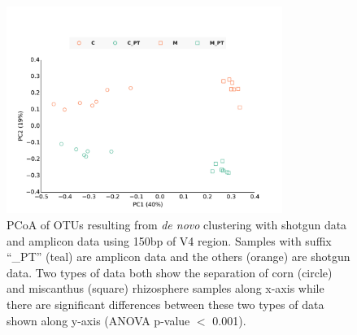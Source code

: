 \documentclass[12pt]{article}
\begin{document}
\begin{figure}[tbph!]
  \centering
  \includegraphics[width=0.8\textwidth]{figs/V4_SGvsPT_pcoa}

  \caption[PCoA of OTUs resulting from {\em de novo} clustering with
  shotgun data and amplicon data using 150bp of V4 region]{PCoA of
  OTUs resulting from {\em de novo} clustering with shotgun data and
  amplicon data using 150bp of V4 region. Samples with suffix ``\_PT''
  (teal) are amplicon data and the others (orange) are shotgun
  data. Two types of data both show the separation of corn (circle)
  and miscanthus (square) rhizosphere samples along x-axis while there
  are significant differences between these two types of data shown
  along y-axis (ANOVA p-value $<$ 0.001).}

  \label{fig:V4_SGvsPT_pcoa}
\end{figure}
\end{document}
